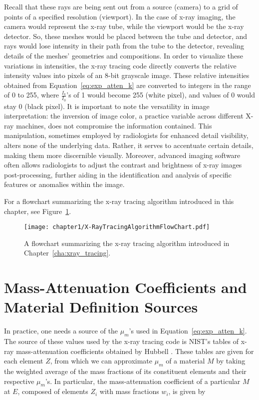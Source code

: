 \par Recall that these rays are being sent out from a source (camera) to a grid of points of a specified resolution (viewport). In the case of x-ray imaging, the camera would represent the x-ray tube, while the viewport would be the x-ray detector. So, these meshes would be placed between the tube and detector, and rays would lose intensity in their path from the tube to the detector, revealing details of the meshes' geometries and compositions. In order to visualize these variations in intensities, the x-ray tracing code directly converts the relative intensity values into pixels of an 8-bit grayscale image. These relative intensities obtained from Equation~\ref{eq:exp_atten_k} are converted to integers in the range of 0 to 255, where $\frac{I_k}{I_0}$'s of 1 would become 255 (white pixel), and values of 0 would stay 0 (black pixel). It is important to note the versatility in image interpretation: the inversion of image color, a practice variable across different X-ray machines, does not compromise the information contained. This manipulation, sometimes employed by radiologists for enhanced detail visibility, alters none of the underlying data. Rather, it serves to accentuate certain details, making them more discernible visually. Moreover, advanced imaging software often allows radiologists to adjust the contrast and brightness of x-ray images post-processing, further aiding in the identification and analysis of specific features or anomalies within the image.


\par For a flowchart summarizing the x-ray tracing algorithm introduced in this chapter, see Figure~\ref{fig:xray_trace_flowchart}.
\newpage
\begin{figure}[htb!]
  \centering
  \texttt{[image: chapter1/X-RayTracingAlgorithmFlowChart.pdf]}
  \caption{A flowchart summarizing the x-ray tracing algorithm introduced in Chapter~\ref{cha:xray_tracing}.}
  \label{fig:xray_trace_flowchart}
\end{figure}
\newpage
\section{Mass-Attenuation Coefficients and Material Definition Sources}
In practice, one needs a source of the $\mu_m$'s used in Equation~\ref{eq:exp_atten_k}. The source of these values used by the x-ray tracing code is NIST's tables of x-ray mass-attenuation coefficients obtained by Hubbell \cite{hubbell1982photon}. These tables are given for each element $Z$, from which we can approximate $\mu_m$ of a material $M$ by taking the weighted average of the mass fractions of its constituent elements and their respective $\mu_m$'s. In particular, the mass-attenuation coefficient of a particular $M$ at $E$, composed of elements ${Z_i}$ with mass fractions ${w_i}$, is given by

